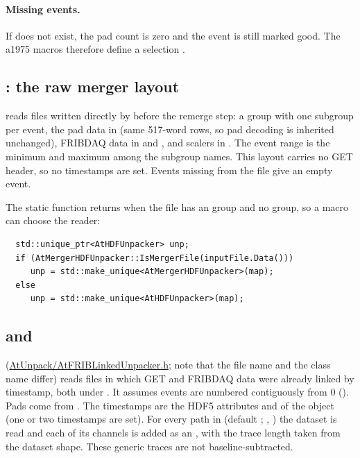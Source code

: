 \paragraph{Missing events.} If  does not exist, the pad count is zero and the
event is still marked good. The a1975 macros therefore define a selection
.

\subsection{: the raw merger layout}

 reads files written directly by  before the
remerge step: a group  with one subgroup  per event, the pad data in
 (same 517-word rows, so pad decoding is inherited unchanged), FRIBDAQ
data in  and , and scalers in . The
event range is the minimum and maximum  among the subgroup names. This layout carries no
GET header, so no timestamps are set. Events missing from the file give an empty event.

The static function  returns  when the
file has an  group and no  group, so a macro can choose the reader:
\begin{verbatim}
  std::unique_ptr<AtHDFUnpacker> unp;
  if (AtMergerHDFUnpacker::IsMergerFile(inputFile.Data()))
     unp = std::make_unique<AtMergerHDFUnpacker>(map);
  else
     unp = std::make_unique<AtHDFUnpacker>(map);
\end{verbatim}

\subsection{ and }

 (\url{AtUnpack/AtFRIBLinkedUnpacker.h}; note that the file name and
the class name differ) reads files in which GET and FRIBDAQ data were already linked by timestamp,
both under . It assumes events are numbered contiguously from 0
(). Pads come from . The
timestamps are the HDF5 attributes  and  of the
 object (one or two timestamps are set). For every path in 
(default ; , ) the dataset
 is read and each of its channels is added as an
, with the trace length taken from the dataset shape. These generic traces are
not baseline-subtracted.

